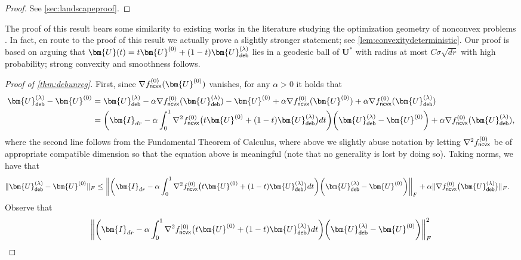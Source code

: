 \documentclass[10pt]{article}
\newcommand{\s}{^*}
\theoremstyle{definition}
\begin{document}
\begin{proof}
See \cref{sec:landscapeproof}.
\end{proof}
The proof of this result bears some similarity to existing works in the literature studying the optimization geometry of nonconvex problems \citep{ge_no_2017,luo_nonconvex_2022}. In fact, en route to the proof of this result we actually prove a slightly stronger statement; see \cref{lem:convexitydeterministic}.  Our proof is based on arguing that $\bm{U}(t) = t \bm{U}^{(0)} + (1 - t) \bm{U}^{(\lambda)}_{{\sf deb}}$ lies in a geodesic ball of $\bm{U}\s$ with radius at most $C \sigma \sqrt{dr}$ with high probability; strong convexity and smoothness follows.  


\begin{proof}[Proof of \cref{thm:debunreg}]
First, since $\nabla f^{(0)}_{{\sf ncvx}}(\bm{U}^{(0)})$ vanishes, for any $\alpha > 0$ it holds that
\begin{align}
    \bm{U}^{(\lambda)}_{{\sf deb}} - \bm{U}^{(0)} &=    \bm{U}^{(\lambda)}_{\sf deb}- \alpha \nabla f^{(0)}_{{\sf ncvx}}(\bm{U}^{(\lambda)}_{{\sf deb}} )- \bm{U}^{(0)}+ \alpha \nabla f^{(0)}_{{\sf ncvx}}(\bm{U}^{(0)}) + \alpha \nabla f^{(0)}_{{\sf ncvx}}(\bm{U}^{(\lambda)}_{{\sf deb}}) \\
    &= \bigg( \bm{I}_{dr} - \alpha \int_{0}^{1} \nabla^2 f^{(0)}_{{\sf ncvx}}\big( t \bm{U}^{(0)} + (1 - t) \bm{U}^{(\lambda)}_{{\sf deb}} \big) dt \bigg) \bigg( \bm{U}_{{\sf deb}}^{(\lambda)} - \bm{U}^{(0)} \bigg) + \alpha \nabla f^{(0)}_{{\sf ncvx}}(\bm{U}^{(\lambda)}_{{\sf deb}}),
\end{align}
where the second line follows from the Fundamental Theorem of Calculus, where above we slightly abuse notation by letting $\nabla^2 f^{(0)}_{{\sf ncvx}}$ be of appropriate compatible dimension so that the equation above is meaningful (note that no generality is lost by doing so).
Taking norms, we have that
\begin{align}
    \|  \bm{U}^{(\lambda)}_{{\sf deb}} - \bm{U}^{(0)} \|_F &\leq \bigg\| \bigg( \bm{I}_{dr} - \alpha \int_{0}^{1} \nabla^2 f^{(0)}_{{\sf ncvx}}\big( t \bm{U}^{(0)} + (1 - t) \bm{U}^{(\lambda)}_{{\sf deb}} \big) dt \bigg) \bigg( \bm{U}_{{\sf deb}}^{(\lambda)} - \bm{U}^{(0)} \bigg)\bigg\|_F + \alpha \| \nabla f^{(0)}_{{\sf ncvx}} \big( \bm{U}_{{\sf deb}}^{(\lambda)} \big) \|_F.
\end{align}
Observe that
\begin{align}
 \bigg\| &\bigg( \bm{I}_{dr} - \alpha \int_{0}^{1} \nabla^2 f^{(0)}_{{\sf ncvx}}\big( t \bm{U}^{(0)} + (1 - t) \bm{U}^{(\lambda)}_{{\sf deb}} \big) dt \bigg) \bigg( \bm{U}_{{\sf deb}}^{(\lambda)} - \bm{U}^{(0)} \bigg)\bigg\|_F^2 \\

\end{align}
\end{proof}
\end{document}
